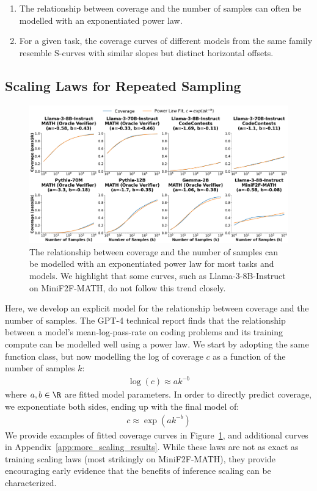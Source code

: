 \documentclass[11pt]{article}
\begin{document}
\begin{enumerate}
    \item The relationship between coverage and the number of samples can often be modelled with an exponentiated power law.
    \item For a given task, the coverage curves of different models from the same family resemble S-curves with similar slopes but distinct horizontal offsets.
\end{enumerate}


\subsection{Scaling Laws for Repeated Sampling}


\begin{figure}
    \centering
    \includegraphics[width=\textwidth]{figures/fit_curves2.pdf}
    
    \caption{The relationship between coverage and the number of samples can be modelled with an exponentiated power law for most tasks and models. We highlight that some curves, such as Llama-3-8B-Instruct on MiniF2F-MATH, do not follow this trend closely.}
    
    \label{fig:powerlaw}
\end{figure}

Here, we develop an explicit model for the relationship between coverage and the number of samples. The GPT-4 technical report \cite{openai2024gpt4technicalreport} finds that the relationship between a model’s mean-log-pass-rate on coding problems and its training compute can be modelled well using a power law. We start by adopting the same function class, but now modelling the log of coverage $c$ as a function of the number of samples $k$: 
\begin{align}
    \log(c) \approx a k^{-b}
\end{align}
where $a,b \in \R$ are fitted model parameters. 
In order to directly predict coverage, we exponentiate both sides, ending up with the final model of:
\begin{align}
\label{eq:scaling_law}
    c \approx \exp(a k^{-b})
\end{align}
We provide examples of fitted coverage curves in Figure~\ref{fig:powerlaw}, and additional curves in Appendix~\ref{app:more_scaling_results}. While these laws are not as exact as training scaling laws (most strikingly on MiniF2F-MATH), they provide encouraging early evidence that the benefits of inference scaling can be characterized.
\end{document}
